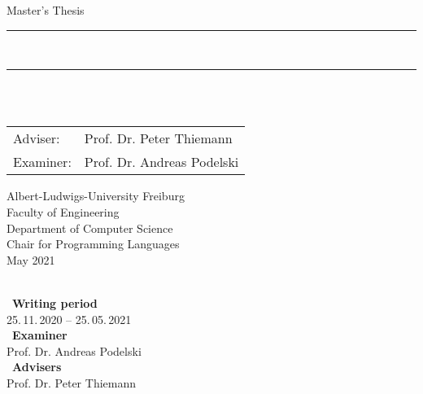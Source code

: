 
\begin{titlepage}
\begin{center}

\newcommand{\HorizontalLine}{\rule{\linewidth}{0.3mm}}

{\Large Master's Thesis}\\[1.3cm]


\HorizontalLine \\[0.4cm]
{ \huge \bfseries \thetitle }
\HorizontalLine \\[1.5cm]


{\Huge \theauthor} \\[2cm]


\begin{tabular}[hc]{>{\huge}l >{\huge}l}
  Adviser: & Prof. Dr. Peter Thiemann \\[0.3cm]
  Examiner: & Prof. Dr. Andreas Podelski \\[1.2cm]
\end{tabular}
\vfill  %

\Large {
    Albert-Ludwigs-University Freiburg\\
    Faculty of Engineering\\
    Department of Computer Science\\
    Chair for Programming Languages\\[1cm]

    May 2021\\
}
\end{center}
\end{titlepage}

\thispagestyle{empty}
\ \vfill \ \\  %
\
\textbf{Writing period}            \smallskip{} \\
25.\,11.\,2020 -- 25.\,05.\,2021   \bigskip{} \\
\
\textbf{Examiner}                  \smallskip{} \\
Prof. Dr. Andreas Podelski           \bigskip{} \\
\
\textbf{Advisers}                  \smallskip{} \\
Prof. Dr. Peter Thiemann

